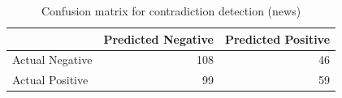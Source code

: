 \begin{table}
\caption{Confusion matrix for contradiction detection (news)}
\label{tab:confusion_matrix}
\begin{tabular}{lrr}
\toprule
 & Predicted Negative & Predicted Positive \\
\midrule
Actual Negative & 108 & 46 \\
Actual Positive & 99 & 59 \\
\bottomrule
\end{tabular}
\end{table}
